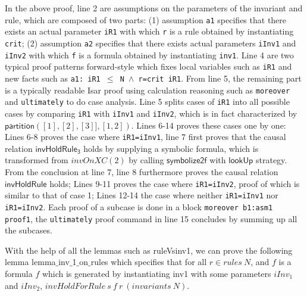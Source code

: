 \documentclass[final]{IEEEtran}
\def \iInv {iInv}
\def \iR {iR}
\begin{document}
In the above proof, line 2 are assumptions on the parameters of the invariant and rule, which are composed of two parts: (1) assumption {\tt a1} specifies that there exists an actual parameter {\tt \iR1} with which {\tt r} is a rule obtained by instantiating {\tt crit}; (2) assumption {\tt a2} specifies that  there exists   actual parameters {\tt \iInv1} and {\tt \iInv2} with which {\tt f} is a formula obtained by instantiating {\tt inv1}.
Line 4 are two typical  proof patterns forward-style which fixes local variables such as {\tt \iR1} and new facts such as {\tt a1: iR1 $\le$ N $\wedge$ r=crit \iR1}. From line 5, the remaining part  is a typically readable Isar proof using calculation
reasoning such as {\tt moreover} and {\tt ultimately} to do  case analysis.
Line 5 splits cases of {\tt iR1} into all possible cases by comparing
{\tt \iR1} with {\tt \iInv1} and {\tt \iInv2}, which is in fact characterized by $\mathsf{partition}([1],[2],[3]],[1,2])$. Lines 6-14  proves    these cases one by one: Lines 6-8 proves the case where {\tt iR1=\iInv1}, line 7 first proves that the causal relation $\mathsf{invHoldRule_3}$ holds by supplying a symbolic formula, which is transformed from $invOnXC(2)$  by calling $\mathsf{symbolize2f}$ with $\mathsf{lookUp}$ strategy.  %
From the conclusion at line 7, line 8 furthermore proves the causal relation $\mathsf{invHoldRule}$  holds; Lines 9-11 proves the case where {\tt iR1=\iInv2}, proof of which is similar to that of case 1; Lines 12-14 the case   where neither {\tt iR1=\iInv1} nor {\tt iR1=\iInv2}. Each proof of a subcase is done in a block {\tt moreover b1:asm1 proof1}, the {\tt ultimately}  proof command in line 15 concludes by summing up all the subcases.



With the help of all the lemmas such as {\sf ruleVsinv1},  we can prove the following lemma  {\sf lemma$\_$inv$\_$1$\_$on$\_$rules} which
specifies that for all $r \in rules ~N$, and $f$ is a formula $f$ which is generated by instantiating inv1 with some parameters $\iInv_1$ and $iInv_2$, $invHoldForRule ~s~ f~ r~ (invariants~ N)$.
\end{document}
